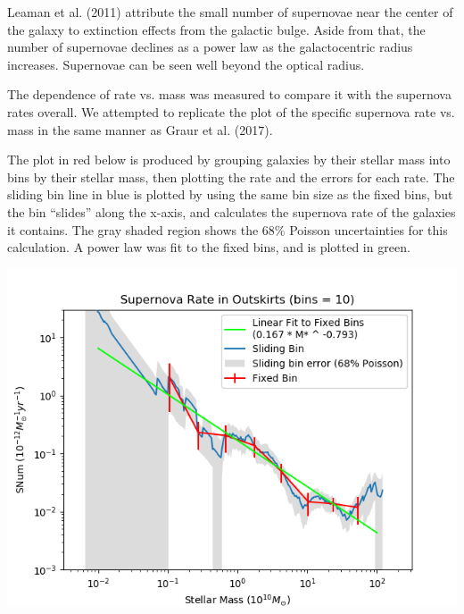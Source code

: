 \documentclass[apj]{emulateapj}
\begin{document}
Leaman et al. (2011) attribute the small number of supernovae near the center of the galaxy to extinction effects from the galactic bulge. Aside from that, the number of supernovae declines as a power law as the galactocentric radius increases. Supernovae can be seen well beyond the optical radius.

The dependence of rate vs. mass was measured to compare it with the supernova rates overall. We attempted to replicate the plot of the specific supernova rate vs. mass in the same manner as Graur et al. (2017).

The plot in red below is produced by grouping galaxies by their stellar mass into bins by their stellar mass, then plotting the rate and the errors for each rate. The sliding bin line in blue is plotted by using the same bin size as the fixed bins, but the bin “slides” along the x-axis, and calculates the supernova rate of the galaxies it contains. The gray shaded region shows the 68\% Poisson uncertainties for this calculation. A power law was fit to the fixed bins, and is plotted in green.

\includegraphics[scale=0.5]{outskirts_sn_rate_vs_mass}
\end{document}
